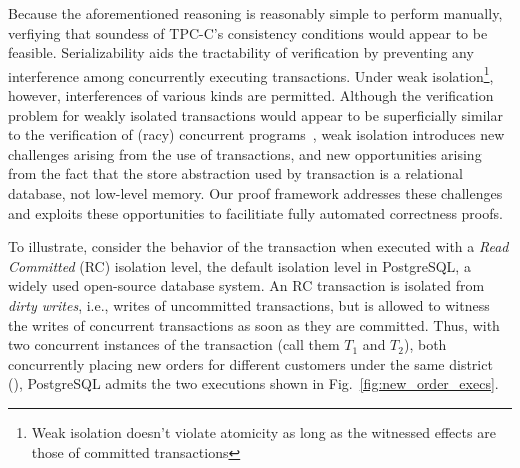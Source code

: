Because the aforementioned reasoning is reasonably simple to perform
manually, verfiying that soundess of TPC-C's consistency conditions
would appear to be feasible.  Serializability aids the tractability of
verification by preventing any interference among concurrently
executing transactions.  Under weak isolation\footnote{Weak isolation
  doesn't violate atomicity as long as the witnessed effects are those
  of committed transactions}, however, interferences of various kinds
are permitted.  Although the verification problem for weakly isolated
transactions would appear to be superficially similar to the
verification of (racy) concurrent programs~\cite{concurrentGC...},
weak isolation introduces new challenges arising from the use of
transactions, and new opportunities arising from the fact that the
store abstraction used by transaction is a relational database, not
low-level memory.  Our proof framework addresses these challenges and
exploits these opportunities to facilitiate fully automated
correctness proofs.

To illustrate, consider the behavior of the  transaction
when executed with a \emph{Read Committed} (RC) isolation level, the
default isolation level in PostgreSQL, a widely used open-source
database system.  An RC transaction is isolated from \emph{dirty
  writes}, i.e., writes of uncommitted transactions, but is allowed to
witness the writes of concurrent transactions as soon as they are
committed. Thus, with two concurrent instances of the 
transaction (call them $T_1$ and $T_2$), both concurrently placing new
orders for different customers under the same district (),
PostgreSQL admits the two executions shown in
Fig.~\ref{fig:new_order_execs}.

